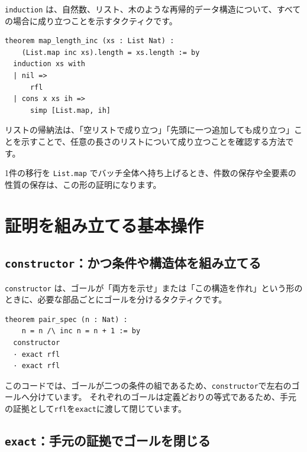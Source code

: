 \texttt{induction} は、自然数、リスト、木のような再帰的データ構造について、すべての場合に成り立つことを示すタクティクです。

\begin{listing}[htbp]
\begin{verbatim}
theorem map_length_inc (xs : List Nat) :
    (List.map inc xs).length = xs.length := by
  induction xs with
  | nil =>
      rfl
  | cons x xs ih =>
      simp [List.map, ih]
\end{verbatim}
\caption{\texttt{map\_length\_inc}}
\label{lst:appA_induction}
\end{listing}

リストの帰納法は、「空リストで成り立つ」「先頭に一つ追加しても成り立つ」ことを示すことで、任意の長さのリストについて成り立つことを確認する方法です。

1件の移行を \texttt{List.map} でバッチ全体へ持ち上げるとき、件数の保存や全要素の性質の保存は、この形の証明になります。

\section{証明を組み立てる基本操作}

\subsection{\texttt{constructor}：かつ条件や構造体を組み立てる}

\texttt{constructor} は、ゴールが「両方を示せ」または「この構造を作れ」という形のときに、必要な部品ごとにゴールを分けるタクティクです。

\begin{listing}[htbp]
\begin{verbatim}
theorem pair_spec (n : Nat) :
    n = n /\ inc n = n + 1 := by
  constructor
  · exact rfl
  · exact rfl
\end{verbatim}
\caption{\texttt{pair\_spec}}
\label{lst:appA_constructor_exact}
\end{listing}

このコードでは、ゴールが二つの条件の組であるため、\texttt{constructor}で左右のゴールへ分けています。
それぞれのゴールは定義どおりの等式であるため、手元の証拠として\texttt{rfl}を\texttt{exact}に渡して閉じています。

\subsection{\texttt{exact}：手元の証拠でゴールを閉じる}

